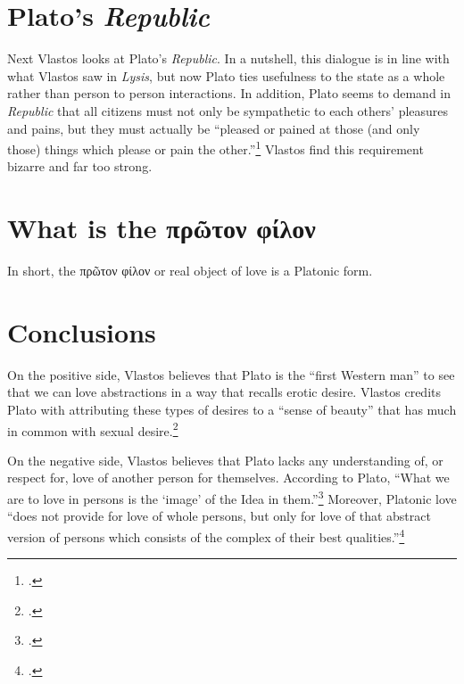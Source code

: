 \documentclass[12pt,letterpaper]{article}
\begin{document}
\section*{Plato's \textit{Republic}}

Next Vlastos looks at Plato's \textit{Republic}. In a nutshell, this dialogue is in line with what Vlastos saw in \textit{Lysis}, but now Plato ties usefulness to the state as a whole rather than person to person interactions. In addition, Plato seems to demand in \textit{Republic} that all citizens must not only be sympathetic to each others' pleasures and pains, but they must actually be ``pleased or pained at those (and only those) things which please or pain the other.''\footcite[][18]{vlastos-individual-object-love-plato-1969} Vlastos find this requirement bizarre and far too strong.

\section*{What is the \textgreek{πρῶτον φίλον}}

In short, the \textgreek{πρῶτον φίλον} or real object of love is a Platonic form.

\section*{Conclusions}

On the positive side, Vlastos believes that Plato is the ``first Western man'' to see that we can love abstractions in a way that recalls erotic desire. Vlastos credits Plato with attributing these types of desires to a ``sense of beauty'' that has much in common with sexual desire.\footcite[][27]{vlastos-individual-object-love-plato-1969}

On the negative side, Vlastos believes that Plato lacks any understanding of, or respect for, love of another person for themselves. According to Plato, ``What we are to love in persons is the `image' of the Idea in them.''\footcite[][31]{vlastos-individual-object-love-plato-1969} Moreover, Platonic love ``does not provide for love of whole persons, but only for love of that abstract version of persons which consists of the complex of their best qualities.''\footcite[][31]{vlastos-individual-object-love-plato-1969}

\newpage
\pagestyle{references}
\printbibliography[filter=sources,title={Ancient Sources: Editions, Translations, Commentaries}]
\printbibliography[filter=secondary,title=Secondary Literature]
\end{document}

